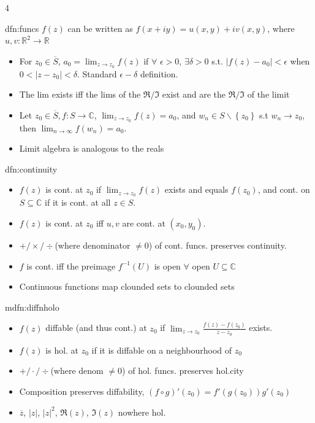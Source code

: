 \documentclass[landscape, 8pt]{extarticle}
\begin{document}
\begin{multicols*}{4}
		
		\begin{dfn}{dfn:funcs}{ }
			$f(z)$ can be written as $f(x+iy) = u(x, y) + iv(x, y)$, where $u, v: \mathbb{R}^2 \to \mathbb{R}$
			\begin{itemize}
				\item For $z_0 \in \overline{S}$, $a_0 = \lim_{z\to z_0}f(z)$ if $\forall$ $\epsilon > 0$, $\exists \delta > 0$ s.t. $\left|f(z) - a_0\right| <\epsilon$ when $0 < \left|z - z_0\right| < \delta$. Standard $\epsilon - \delta$ definition.
				\item The lim exists iff the lims of the $\Re / \Im$ exist and are the $\Re / \Im$ of the limit
				\item Let $z_0 \in \overline{S}, f: S \to \mathbb{C}$, $\lim_{z\to z_0}f(z) = a_0$, and $w_n \in S \backslash \left\{z_0\right\}$ s.t $w_n \to z_0$, then $\lim_{n\to \infty} f(w_n) = a_0$.
				\item Limit algebra is analogous to the reals
			\end{itemize}
			
		\end{dfn}
		
		
		\begin{dfn}[Continuity]{dfn:continuity}{ }
			\begin{itemize}
				\item $f(z)$ is cont. at $z_0$ if $\lim_{z\to z_0} f(z)$ exists and equals $f(z_0)$, and cont. on $S \subseteq \mathbb{C}$ if it is cont. at all $z \in S$. 
				\item $f(z)$ is cont. at $z_0$ iff $u, v$ are cont. at $(x_0, y_0)$.
				\item $+/\times/\div$(where denominator $\ne 0$) of cont. funcs. preserves continuity.
				\item $f$ is cont. iff the preimage $f^{-1}(U)$ is open $\forall$ open $U \subseteq \mathbb{C}$
				\item Continuous functions map clounded sets to clounded sets
			\end{itemize}
			
		\end{dfn}
		
		
		\begin{mdfn}{mdfn:diffnholo}{ }
			\begin{itemize}
				\item $f(z)$ diffable (and thus cont.) at $z_0$ if $\lim_{z \to z_0} \frac{f(z) - f(z_0)}{z-z_0}$ exists.
				\item $f(z)$ is hol. at $z_0$ if it is diffable on a neighbourhood of $z_0$
				\item $+/\cdot / \div$(where denom $\ne 0$) of hol. funcs. preserves hol.city
				\item Composition preserves diffability, $(f \circ g)'(z_0) = f'(g(z_0))g'(z_0)$
				\item $\overline{z}$, $\left|z\right|$, $\left|z\right|^2$, $\Re(z)$, $\Im(z)$ nowhere hol.
			\end{itemize}
			

\end{mdfn}
\end{multicols*}
\end{document}
